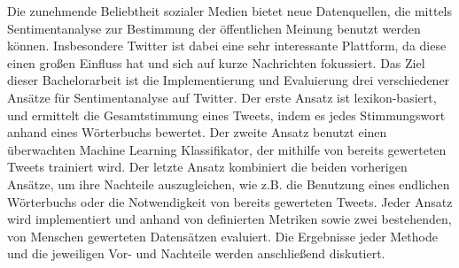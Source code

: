 Die zunehmende Beliebtheit sozialer Medien bietet neue Datenquellen, die mittels Sentimentanalyse zur Bestimmung der öffentlichen Meinung benutzt werden können. Insbesondere Twitter ist dabei eine sehr interessante Plattform, da diese einen großen Einfluss hat und sich auf kurze Nachrichten fokussiert. Das Ziel dieser Bachelorarbeit ist die Implementierung und Evaluierung drei verschiedener Ansätze für Sentimentanalyse auf Twitter. Der erste Ansatz ist lexikon-basiert, und ermittelt die Gesamtstimmung eines Tweets, indem es jedes Stimmungswort anhand eines Wörterbuchs bewertet. Der zweite Ansatz benutzt einen überwachten Machine Learning Klassifikator, der mithilfe von bereits gewerteten Tweets trainiert wird. Der letzte Ansatz kombiniert die beiden vorherigen Ansätze, um ihre Nachteile auszugleichen, wie z.B. die Benutzung eines endlichen Wörterbuchs oder die Notwendigkeit von bereits gewerteten Tweets. Jeder Ansatz wird implementiert und anhand von definierten Metriken sowie zwei bestehenden, von Menschen gewerteten Datensätzen evaluiert. Die Ergebnisse jeder Methode und die jeweiligen Vor- und Nachteile werden anschließend diskutiert.












